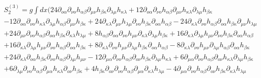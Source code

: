 \documentclass[a4paper,12pt]{article}
\begin{document}
\begin{equation}
\begin{array}{l}
S_2^{(3)}  = g\int {dx(24\partial _{ o\alpha} \partial _{\nu o}
h_{\alpha\beta} \partial _{\mu\nu} h_{\beta\kappa} \partial
_{\lambda\mu}
 h_{\kappa\lambda}}
+ 12\partial _{ o\alpha} \partial _{\nu o} h_{\alpha\beta} \partial _{\mu\nu} h_{\kappa\lambda} \partial _{\lambda\mu} h_{\beta\kappa}   \\
   - 12\partial _{ o\alpha} \partial _{\nu o} h_{\kappa\lambda} \partial _{\lambda\mu} h_{\alpha\beta} \partial _{\mu\nu} h_{\beta\kappa}  + 24\partial _{\kappa\lambda} \partial _{\mu\nu} h_{\lambda\mu} \partial _{\nu o} h_{\beta\kappa} \partial _{ o\alpha} h_{\alpha\beta}  - 24\partial _{\kappa\lambda} \partial _{\nu o} h_{\alpha\beta} \partial _{ o\alpha} h_{\beta\kappa} \partial _{\mu\nu} h_{\lambda\mu}  \\
   + 24\partial _{\mu\nu} \partial _{\nu o} h_{\alpha\beta} \partial _{ o\alpha} h_{\beta\kappa} \partial _{\kappa\lambda} h_{\lambda\mu}  + 8h_{\alpha\beta} \partial _{ o\alpha} \partial _{\nu o} h_{\mu\nu} \partial _{\kappa\lambda} \partial _{\lambda\mu} h_{\beta\kappa}  + 16\partial _{\kappa\lambda} \partial _{\lambda\mu} h_{\mu\nu} \partial _{\nu o} h_{\beta\kappa} \partial _{ o\alpha} h_{\alpha\beta}   \\
   + 16\partial _{\kappa\lambda} \partial _{\lambda\mu} h_{\mu\nu} \partial _{\nu o} h_{\alpha\beta} \partial _{ o\alpha} h_{\beta\kappa}  + 8\partial _{\kappa\lambda} \partial _{\nu o} h_{\mu\nu} \partial _{\lambda\mu} h_{\beta\kappa} \partial _{ o\alpha} h_{\alpha\beta}  - 8\partial _{\kappa\lambda} \partial _{\nu o} h_{\mu\nu} \partial _{\lambda\mu} h_{\alpha\beta} \partial _{ o\alpha} h_{\beta\kappa}  \\
   + 24\partial _{\kappa\lambda} \partial _{ o\alpha} h_{\beta\kappa} \partial _{\nu o} h_{\alpha\beta} \partial _{\lambda\mu} h_{\mu\nu}  - 12\partial _{\mu\alpha} \partial _{\nu o} h_{\alpha\beta} \partial _{ o\nu} h_{\beta\kappa} \partial _{\lambda\mu} h_{\kappa\lambda}  + 6\partial _{\mu\alpha} \partial _{\nu o} h_{\alpha\beta} \partial _{ o\nu} h_{\kappa\lambda} \partial _{\lambda\mu} h_{\beta\kappa}  \\
   + 6\partial _{\lambda\mu} \partial _{\nu o} h_{\alpha\beta} \partial _{\mu\alpha} h_{\kappa\lambda} \partial _{ o\nu} h_{\beta\kappa}  + 4h_{\beta\kappa} \partial _{ o\nu} \partial _{\nu o} h_{\alpha\beta} \partial _{\mu\alpha} \partial _{\kappa\lambda} h_{\lambda\mu}  - 4\partial _{\mu\alpha} \partial _{\nu o} h_{\alpha\beta} \partial _{ o\nu} h_{\beta\kappa} \partial _{\kappa\lambda} h_{\lambda\mu}   \\

\end{array}
\end{equation}
\end{document}
